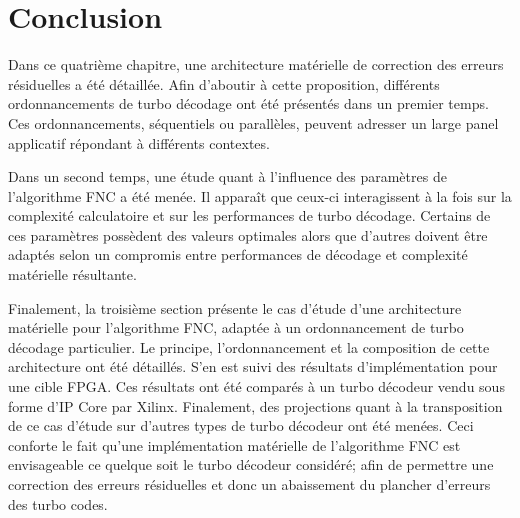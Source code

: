 \begin{table}[!t]
	\centering
	\caption{Récapitulatif des modifications requises par rapport à l'architecture de référence afin de l'adapter à 
	d'autres ordonnancements de turbo décodeurs.}
	\label{tab:fnc_recap}
\end{table}

\section{Conclusion}
Dans ce quatrième chapitre, une architecture matérielle de correction des erreurs résiduelles a été détaillée. 
Afin d'aboutir à cette proposition, différents ordonnancements de turbo décodage ont été présentés dans un premier temps.
Ces ordonnancements, séquentiels ou parallèles, peuvent adresser un large panel applicatif
répondant à différents contextes.

Dans un second temps, une étude quant à l'influence des paramètres de l'algorithme FNC a été menée. Il apparaît que 
ceux-ci interagissent à la fois sur la complexité calculatoire et sur les performances de turbo décodage.
Certains de ces paramètres possèdent des valeurs optimales alors que d'autres doivent être adaptés selon un
compromis entre performances de décodage et complexité matérielle résultante.

Finalement, la troisième section présente le cas d'étude d'une architecture matérielle pour l'algorithme FNC, adaptée à
un ordonnancement de turbo décodage particulier. Le principe, l'ordonnancement et la composition de cette architecture ont 
été détaillés. S'en est suivi des résultats d'implémentation pour une cible FPGA. Ces résultats ont été comparés à un 
turbo décodeur vendu sous forme d'IP Core par Xilinx. Finalement, des projections quant à la transposition de ce cas 
d'étude sur d'autres
types de turbo décodeur ont été menées. Ceci conforte le fait qu'une implémentation matérielle de l'algorithme FNC est
envisageable ce quelque soit le turbo décodeur considéré; afin de permettre une correction des erreurs résiduelles et
donc un abaissement du plancher d'erreurs des turbo codes.
